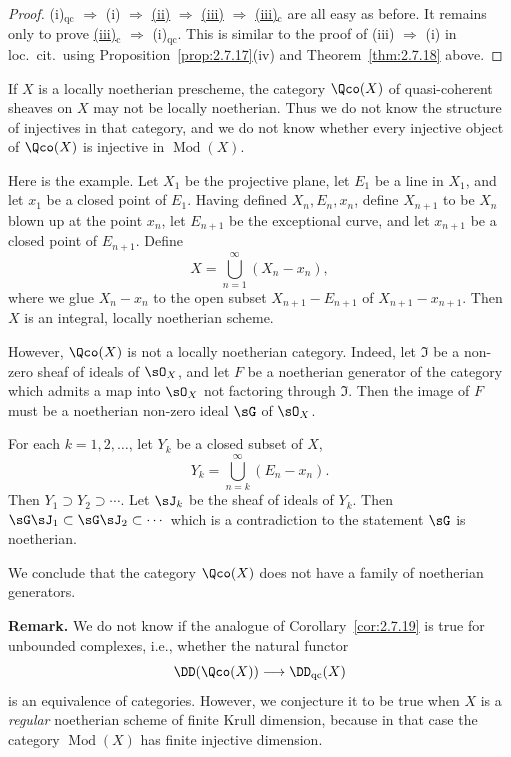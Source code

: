 \begin{proof}
(i)${}_{\mathrm{qc}}$ $\Rightarrow$ (i) $\Rightarrow$ \underline{(ii)} $\Rightarrow$ \underline{(iii)} $\Rightarrow$ \underline{(iii)}${}_{\mathrm{c}}$ are all easy as before. It remains only to prove \underline{(iii)}${}_{\mathrm{c}}$ $\Rightarrow$ (i)${}_{\mathrm{qc}}$. This is similar to the proof of (iii) $\Rightarrow$ (i) in loc.\ cit.\ using Proposition~\ref{prop:2.7.17}(iv) and Theorem~\ref{thm:2.7.18} above.
\end{proof}

\begin{example*}
If $X$ is a locally noetherian prescheme, the category $\Qco(X)$ of quasi-coherent sheaves on $X$ may not be locally noetherian. Thus we do not know the structure of injectives in that category, and we do not know whether every injective object of $\Qco(X)$ is injective in $\operatorname{Mod}(X)$.

Here is the example. Let $X_1$ be the projective plane, let $E_1$ be a line in $X_1$, and let $x_1$ be a closed point of $E_1$. Having defined $X_n, E_n, x_n$, define $X_{n+1}$ to be $X_n$ blown up at the point $x_n$, let $E_{n+1}$ be the exceptional curve, and let $x_{n+1}$ be a closed point of $E_{n+1}$. Define
\[
X = \bigcup_{n=1}^{\infty} (X_n - x_n),
\]
where we glue $X_n-x_n$ to the open subset $X_{n+1}-E_{n+1}$ of $X_{n+1}-x_{n+1}$. Then $X$ is an integral, locally noetherian scheme.

However, $\Qco(X)$ is not a locally noetherian category. Indeed, let $\mathfrak{I}$ be a non-zero sheaf of ideals of $\sO_X$, and let $F$ be a noetherian generator of the category which admits a map into $\sO_X$ not factoring through $\mathfrak{I}$. Then the image of $F$ must be a noetherian non-zero ideal $\sG$ of $\sO_X$.

For each $k=1,2,\dots$, let $Y_k$ be a closed subset of $X$,
\[
Y_k = \bigcup_{n=k}^{\infty} (E_n - x_n).
\]
Then $Y_1 \supset Y_2 \supset \cdots$. Let $\sJ_k$ be the sheaf of ideals of $Y_k$. Then $\sG\sJ_1 \subset \sG\sJ_2 \subset \cdots$ which is a contradiction to the statement $\sG$ is noetherian.

We conclude that the category $\Qco(X)$ does not have a family of noetherian generators.
\end{example*}

\textbf{Remark.}
We do not know if the analogue of Corollary~\ref{cor:2.7.19} is true for unbounded complexes, i.e., whether the natural functor
\[
\DD(\Qco(X)) \longrightarrow \DD_{\mathrm{qc}}(X)
\]
is an equivalence of categories. However, we conjecture it to be true when $X$ is a \emph{regular} noetherian scheme of finite Krull dimension, because in that case the category $\operatorname{Mod}(X)$ has finite injective dimension.
